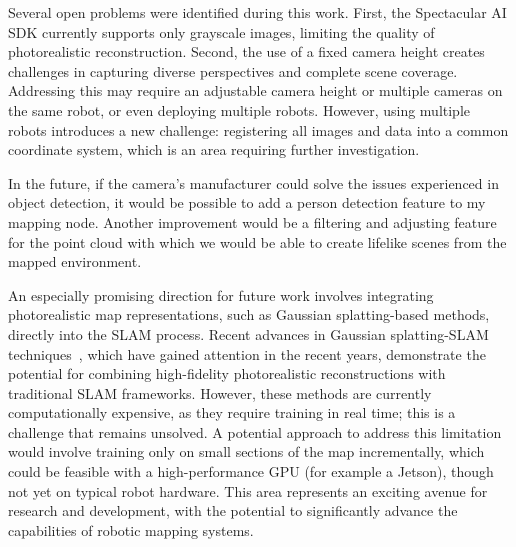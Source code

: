 Several open problems were identified during this work. First, the Spectacular AI SDK currently supports only grayscale images, limiting the quality of photorealistic reconstruction. Second, the use of a fixed camera height creates challenges in capturing diverse perspectives and complete scene coverage. Addressing this may require an adjustable camera height or multiple cameras on the same robot, or even deploying multiple robots. However, using multiple robots introduces a new challenge: registering all images and data into a common coordinate system, which is an area requiring further investigation.

In the future, if the camera's manufacturer could solve the issues experienced in object detection, it would be possible to add a person detection feature to my mapping node. Another improvement would be a filtering and adjusting feature for the point cloud with which we would be able to create lifelike scenes from the mapped environment.

An especially promising direction for future work involves integrating photorealistic map representations, such as Gaussian splatting-based methods, directly into the SLAM process. Recent advances in Gaussian splatting-SLAM techniques~\cite{gsplat_slam}, which have gained attention in the recent years, demonstrate the potential for combining high-fidelity photorealistic reconstructions with traditional SLAM frameworks. However, these methods are currently computationally expensive, as they require training in real time; this is a challenge that remains unsolved. A potential approach to address this limitation would involve training only on small sections of the map incrementally, which could be feasible with a high-performance GPU (for example a Jetson), though not yet on typical robot hardware. This area represents an exciting avenue for research and development, with the potential to significantly advance the capabilities of robotic mapping systems.
